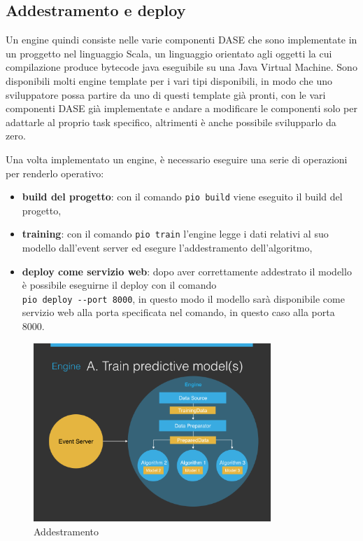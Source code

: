 \subsection{Addestramento e deploy}
Un engine quindi consiste nelle varie componenti DASE che sono implementate in un proggetto nel linguaggio Scala, un linguaggio orientato agli oggetti la cui compilazione produce bytecode java eseguibile su una Java Virtual Machine. Sono disponibili molti engine template per i vari tipi disponibili, in modo che uno sviluppatore possa partire da uno di questi template già pronti, con le vari componenti DASE già implementate e andare a modificare le componenti solo per adattarle al proprio task specifico, altrimenti è anche possibile svilupparlo da zero.

Una volta implementato un engine, è necessario eseguire una serie di operazioni per renderlo operativo:
\begin{itemize}
\item \textbf{build del progetto}: con il comando \verb+pio build+ viene eseguito il build del progetto,
\item \textbf{training}: con il comando \verb+pio train+ l'engine legge i dati relativi al suo modello dall'event server ed esegure l'addestramento dell'algoritmo,
\item \textbf{deploy come servizio web}: dopo aver correttamente addestrato il modello è possibile eseguirne il deploy con il comando \\ \verb+pio deploy --port 8000+, in questo modo il modello sarà disponibile come servizio web alla porta specificata nel comando, in questo caso alla porta 8000.
\end{itemize}

\begin{figure}[!h]
\includegraphics[width=0.8\textwidth]{immagini/training.png}
\caption{Addestramento \cite{sitopredictionio}}
\label{fig:training}
\end{figure}

